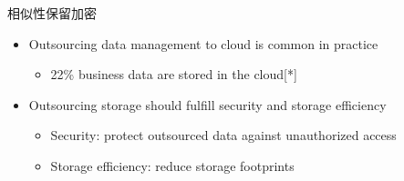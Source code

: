 \documentclass{beamer}
\begin{document}
\begin{frame}{相似性保留加密}
    \begin{itemize}
        \item Outsourcing data management to cloud is common in practice
              \begin{itemize}
                  \item 22\% business data are stored in the cloud[*]
              \end{itemize}
        \item  Outsourcing storage should fulfill security and storage efficiency
              \begin{itemize}
                  \item  Security: protect outsourced data against unauthorized access
                  \item  Storage efficiency: reduce storage footprints
              \end{itemize}
    \end{itemize}
\end{frame}






\end{document}
